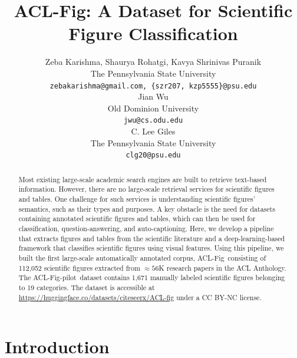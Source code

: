\documentclass{article}
\title{ACL-Fig: A Dataset for Scientific Figure Classification
}
\author{
  Zeba Karishma, Shaurya Rohatgi, Kavya Shrinivas Puranik \\
  The Pennsylvania State University \\
  \texttt{zebakarishma@gmail.com, \{szr207, kzp5555\}@psu.edu} \\
  \And
  Jian Wu \\
  Old Dominion University \\
  \texttt{jwu@cs.odu.edu} \\
   \And
  C. Lee Giles \\
  The Pennsylvania State University \\
  \texttt{clg20@psu.edu} \\
}
\newcommand{\scifig}{{\sc ACL-Fig}}
\newcommand{\scifigp}{{\sc ACL-Fig-pilot}}
\begin{document}
\maketitle


\begin{abstract}
Most existing large-scale academic search engines are built to retrieve text-based information. However, there are no large-scale retrieval services for scientific figures and tables. One challenge for such services is understanding scientific figures' semantics, such as their types and purposes. A key obstacle is the need for datasets containing annotated scientific figures and tables, which can then be used for classification, question-answering, and auto-captioning. Here, we develop a pipeline that extracts figures and tables from the scientific literature and a deep-learning-based framework that classifies scientific figures using visual features. Using this pipeline, we built the first large-scale automatically annotated corpus, \scifig\, consisting of 112,052 scientific figures extracted from $\approx56$K research papers in the ACL Anthology. The \scifigp\ dataset contains 1,671 manually labeled scientific figures belonging to 19 categories. The dataset is  accessible at 
\href{https://huggingface.co/datasets/citeseerx/ACL-fig}{https://huggingface.co/datasets/citeseerx/ACL-fig}
under a CC BY-NC license.
\end{abstract}


\section{Introduction}
\end{document}
